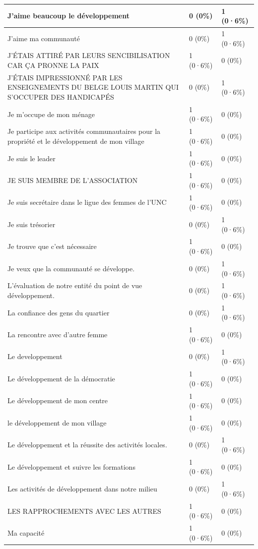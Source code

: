 \documentclass[
]{book}
\begin{document}
\begin{tabular}{l|l|l}
\hline
J'aime beaucoup le développement & 0 (0\%) & 1 (0·6\%)\\
\hline
J'aime ma communauté & 0 (0\%) & 1 (0·6\%)\\
\hline
J'ÉTAIS ATTIRÉ PAR LEURS SENCIBILISATION CAR   ÇA PRONNE LA PAIX & 1 (0·6\%) & 0 (0\%)\\
\hline
J'ÉTAIS IMPRESSIONNÉ PAR LES ENSEIGNEMENTS DU BELGE LOUIS MARTIN QUI S'OCCUPER DES HANDICAPÉS & 0 (0\%) & 1 (0·6\%)\\
\hline
Je m'occupe de mon ménage & 1 (0·6\%) & 0 (0\%)\\
\hline
Je participe aux activités communautaires pour la propriété et le développement de mon village & 1 (0·6\%) & 0 (0\%)\\
\hline
Je suis le leader & 1 (0·6\%) & 0 (0\%)\\
\hline
JE SUIS MEMBRE DE L'ASSOCIATION & 1 (0·6\%) & 0 (0\%)\\
\hline
Je suis secrétaire dans le ligue des femmes de l'UNC & 1 (0·6\%) & 0 (0\%)\\
\hline
Je suis trésorier & 0 (0\%) & 1 (0·6\%)\\
\hline
Je trouve que c'est nécessaire & 1 (0·6\%) & 0 (0\%)\\
\hline
Je veux que la communauté se développe. & 0 (0\%) & 1 (0·6\%)\\
\hline
L'évaluation de notre entité du point de vue développement. & 0 (0\%) & 1 (0·6\%)\\
\hline
La confiance des gens du quartier & 0 (0\%) & 1 (0·6\%)\\
\hline
La rencontre avec d'autre femme & 1 (0·6\%) & 0 (0\%)\\
\hline
Le developpement & 0 (0\%) & 1 (0·6\%)\\
\hline
Le développement de la démocratie & 1 (0·6\%) & 0 (0\%)\\
\hline
Le développement de mon centre & 1 (0·6\%) & 0 (0\%)\\
\hline
le développement de mon village & 1 (0·6\%) & 0 (0\%)\\
\hline
Le développement et la réussite des activités locales. & 0 (0\%) & 1 (0·6\%)\\
\hline
Le développement et suivre les formations & 1 (0·6\%) & 0 (0\%)\\
\hline
Les activités de développement dans notre milieu & 0 (0\%) & 1 (0·6\%)\\
\hline
LES RAPPROCHEMENTS AVEC LES AUTRES & 1 (0·6\%) & 0 (0\%)\\
\hline
Ma capacité & 1 (0·6\%) & 0 (0\%)\\

\end{tabular}
\end{document}
